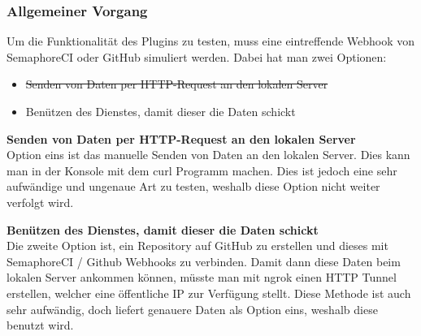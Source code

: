 \begin{minipage}{\textwidth}
  \subsubsection{Allgemeiner Vorgang}
  \label{sec:general-testing}
  Um die Funktionalität des Plugins zu testen, muss eine eintreffende Webhook von SemaphoreCI oder GitHub simuliert werden.
  Dabei hat man zwei Optionen:
  \begin{itemize}
    \item \st{Senden von Daten per HTTP-Request an den lokalen Server}
    \item Benützen des Dienstes, damit dieser die Daten schickt
  \end{itemize}

  \textbf{Senden von Daten per HTTP-Request an den lokalen Server} \\
  Option eins ist das manuelle Senden von Daten an den lokalen Server. Dies kann man in der Konsole mit dem curl Programm
  \cite{everything_curl} machen. Dies ist jedoch eine sehr aufwändige und ungenaue Art zu testen, weshalb diese Option nicht
  weiter verfolgt wird. \newline

  \textbf{Benützen des Dienstes, damit dieser die Daten schickt} \\
  Die zweite Option ist, ein Repository auf GitHub zu erstellen und dieses mit SemaphoreCI / Github Webhooks zu
  verbinden. \newline
  Damit dann diese Daten beim lokalen Server ankommen können, müsste man mit ngrok \cite{ngrok_http_docs} einen HTTP Tunnel
  erstellen, welcher eine öffentliche IP zur Verfügung stellt. \newline
  Diese Methode ist auch sehr aufwändig, doch liefert genauere Daten als Option eins, weshalb diese benutzt wird. \newline
\end{minipage}

